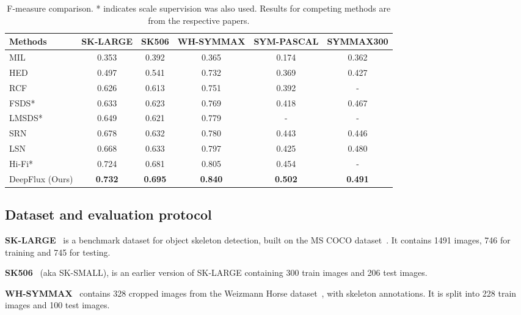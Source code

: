 \documentclass[10pt,twocolumn,letterpaper]{article}
\begin{document}
{\begin{table*}
\begin{center}
\begin{tabular}{|l|c|c|c|c|c|}
\hline
Methods      & SK-LARGE  & SK506  & WH-SYMMAX  &  SYM-PASCAL & SYMMAX300    \\ \hline\hline
MIL~\cite{tsogkas2012mil}  & 0.353   & 0.392  & 0.365 & 0.174 & 0.362     \\ \hline
HED~\cite{xie2015hed}  & 0.497   & 0.541  & 0.732 & 0.369 & 0.427    \\ \hline
RCF~\cite{liu2017rcf}  & 0.626   & 0.613  & 0.751 & 0.392 & -    \\ \hline
FSDS*~\cite{shen2016fsds}  & 0.633   & 0.623  & 0.769 & 0.418 & 0.467    \\ \hline
LMSDS*~\cite{shen2017lmsds} & 0.649 & 0.621 & 0.779 & - & -
\\ \hline
SRN~\cite{ke2017srn} & 0.678   & 0.632  & 0.780 & 0.443 & 0.446    \\ \hline
LSN~\cite{liu2018lsn} & 0.668   & 0.633  & 0.797 & 0.425 & 0.480    \\ \hline
Hi-Fi*~\cite{zhao2018hifi} & 0.724   & 0.681  & 0.805 & 0.454 & -    \\ \hline
DeepFlux (Ours) & \bf{0.732}  & \bf{0.695}  & \bf{0.840}  & \bf{0.502} & \bf{0.491} \\ \hline
\end{tabular}
\end{center}
\caption{F-measure comparison. * indicates scale supervision was also used. Results for competing methods are from the respective papers.}
\label{tab:quantitativeresults}
\end{table*}

\subsection{Dataset and evaluation protocol}\label{sec:datasets}
\noindent\textbf{SK-LARGE}~\cite{shen2017lmsds} is a benchmark dataset for object skeleton detection, built on the MS COCO dataset~\cite{chen2015mscoco}.
It contains 1491 images, 746 for training and 745 for testing.


\medskip

\noindent\textbf{SK506}~\cite{shen2016fsds} (aka SK-SMALL), is an earlier version of SK-LARGE containing 300 train images and 206 test images.

\medskip

\noindent\textbf{WH-SYMMAX}~\cite{shen2016misl} contains 328 cropped images from the Weizmann Horse dataset~\cite{borenstein2002horse}, with skeleton annotations.
It is split into 228 train images and 100 test images.

}
\end{document}
